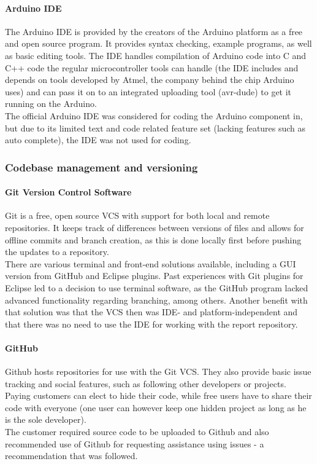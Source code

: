 \paragraph{Arduino IDE}
The Arduino IDE is provided by the creators of the Arduino platform as a free and open source program. It provides syntax checking, example programs, as well as basic editing tools. The IDE handles compilation of Arduino code into C and C++ code the regular microcontroller tools can handle (the IDE includes and depends on tools developed by Atmel, the company behind the chip Arduino uses) and can pass it on to an integrated uploading tool (avr-dude) to get it running on the Arduino.\\
The official Arduino IDE was considered for coding the Arduino component in, but due to its limited text and code related feature set (lacking features such as auto complete), the IDE was not used for coding.

\subsubsection{Codebase management and versioning}
\paragraph{Git Version Control Software}
Git is a free, open source VCS with support for both local and remote repositories. It keeps track of differences between versions of files and allows for offline commits and branch creation, as this is done locally first before pushing the updates to a repository.\\
There are various terminal and front-end solutions available, including a GUI version from GitHub and Eclipse plugins. Past experiences with Git plugins for Eclipse led to a decision to use terminal software, as the GitHub program lacked advanced functionality regarding branching, among others. Another benefit with that solution was that the VCS then was IDE- and platform-independent and that there was no need to use the IDE for working with the report repository.
\paragraph{GitHub}
Github hosts repositories for use with the Git VCS. They also provide basic issue tracking and social features, such as following other developers or projects. Paying customers can elect to hide their code, while free users have to share their code with everyone (one user can however keep one hidden project as long as he is the sole developer).\\
The customer required source code to be uploaded to Github and also recommended use of Github for requesting assistance using issues - a recommendation that was followed.\\

